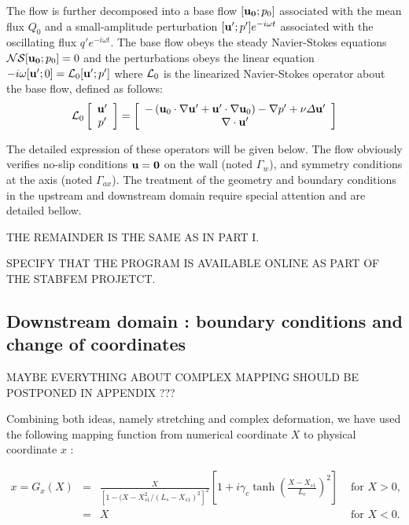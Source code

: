 \documentclass{jfm}
\newcommand\be{\begin{equation}}
\newcommand\ee{\end{equation}}
\begin{document}
The flow is further decomposed into a base flow $[{\bf u_0};p_0]$ associated with the mean flux $Q_0$ and a small-amplitude perturbation  $[{\bf u}';p']e^{-i \omega t}$ associated with the oscillating flux $q' e^{-i \omega t}$.
The base flow obeys the steady Navier-Stokes equations ${\cal NS} [{\bf u_0};p_0] = 0$
and the perturbations obeys the linear equation $- i \omega [{\bf u}';0] = {\cal L}_0 [{\bf u}';p']$ where ${\cal L}_0$
is the linearized Navier-Stokes operator about the base flow, defined as follows: 
\be
{\cal L}_0 \left[\begin{array}{c} {\bf u}' \\ p' \end{array} \right] =
 \left[\begin{array}{c}
- \left( {\bf u}_0 \cdot \nabla {\bf u}' +{\bf u}' \cdot \nabla {\bf u}_0 \right) - \nabla p' + \nu \Delta {\bf u}' \\
 \nabla \cdot {\bf u}' 
\end{array} \right] 
\label{eq:NS}
\ee 

 The detailed expression of these operators will be given below. The flow obviously verifies no-slip conditions ${\bf u} = {\bf 0}$ on the wall (noted $\Gamma_w$),  and symmetry conditions at the axis (noted $\Gamma_{ax}$). The treatment of the geometry and boundary conditions in the upstream and downstream domain require special attention and are detailed bellow.

THE REMAINDER IS THE SAME AS IN PART I.

SPECIFY THAT THE PROGRAM IS AVAILABLE ONLINE AS PART OF THE STABFEM PROJETCT.


\subsection{Downstream domain : boundary conditions and change of coordinates}

MAYBE EVERYTHING ABOUT COMPLEX MAPPING SHOULD BE POSTPONED IN APPENDIX ???



Combining both ideas, namely stretching and complex deformation, we have used the following mapping function from numerical coordinate $X$ to physical coordinate $x$ :



\be
\begin{array}{rcll}
x = G_x(X) &=& \frac{X}{\left[1-(X-X_{s1}^2/(L_s-X_{s1})^2 \right]^2} \left[ 1 + i \gamma_c \tanh \left(\frac{X-X_{s1}}{L_c}\right)^2  \right]  & \mbox{ for } X>0, \\
	& = & X & \mbox{ for } X<0.
\end{array}
\label{eq:mapX}
\ee
\end{document}
